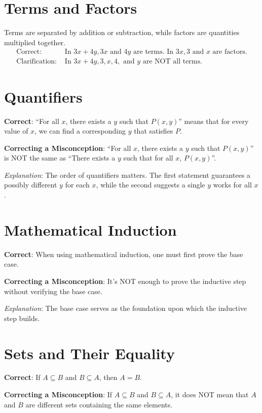 \documentclass[12pt]{article}
\begin{document}
\section*{Terms and Factors}
Terms are separated by addition or subtraction, while factors are quantities multiplied together.
\begin{align*}
    \text{Correct: } & \text{In } 3x + 4y, 3x \text{ and } 4y \text{ are terms. In } 3x, 3 \text{ and } x \text{ are factors.} \\
    \text{Clarification: } & \text{In } 3x + 4y, 3, x, 4, \text{ and } y \text{ are NOT all terms.}
\end{align*}

\section*{Quantifiers}
\textbf{Correct}: ``For all \(x\), there exists a \(y\) such that \(P(x,y)\)'' means that for every value of \(x\), we can find a corresponding \(y\) that satisfies \(P\).

\textbf{Correcting a Misconception}: ``For all \(x\), there exists a \(y\) such that \(P(x,y)\)'' is NOT the same as ``There exists a \(y\) such that for all \(x\), \(P(x,y)\)''.

\textit{Explanation}: The order of quantifiers matters. The first statement guarantees a possibly different \(y\) for each \(x\), while the second suggests a single \(y\) works for all \(x\).

\section*{Mathematical Induction}
\textbf{Correct}: When using mathematical induction, one must first prove the base case.

\textbf{Correcting a Misconception}: It's NOT enough to prove the inductive step without verifying the base case.

\textit{Explanation}: The base case serves as the foundation upon which the inductive step builds.

\section*{Sets and Their Equality}
\textbf{Correct}: If \(A \subseteq B\) and \(B \subseteq A\), then \(A = B\).

\textbf{Correcting a Misconception}: If \(A \subseteq B\) and \(B \subseteq A\), it does NOT mean that \(A\) and \(B\) are different sets containing the same elements.
\end{document}
